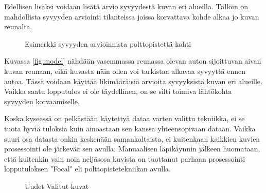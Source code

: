 Edellisen lisäksi voidaan lisätä arvio syvyydestä kuvan eri alueilla. 
Tällöin on mahdollista syvyyden arviointi tilanteissa joissa korvattava kohde alkaa jo kuvan reunalta.

\begin{figure}[h]
\centering
{}
\caption{Esimerkki syvyyden arvioinnista polttopistettä kohti}
\label{fig:polttopiste_2}
\end{figure}

Kuvassa \ref{fig:model} nähdään vasemmassa reunassa olevan auton sijoittuvan aivan kuvan reunaan, 
eikä kuvasta näin ollen voi tarkistaa alkavaa syvyyttä ennen autoa.
Tässä voidaan käyttää likimääräisiä arvioita syvyyksistä kuvan eri alueille. Vaikka saatu lopputulos ei ole täydellinen,
on se silti toimiva lähtökohta syvyyden korvaamiselle.

Koska kyseessä on pelkästään käytettyä dataa varten valittu tekniikka, ei se tuota hyviä tuloksia kuin ainoastaan sen kanssa yhteensopivaan dataan.
Vaikka suuri osa datasta onkin keskenään samankaltaista, ei kuitenkaan kaikkien kuvien prosessointi ole järkevää sen avulla.
Manuaalisen läpikäynnin jälkeen huomataan, että kuitenkin vain noin neljäsosa kuvista on tuottanut parhaan prosessointi lopputuloksen "Focal" eli polttopistetekniikan avulla. 

\begin{figure}[h]
\centering
{}
\caption{Uudet Valitut kuvat}
\label{fig:selected2}
\end{figure}

